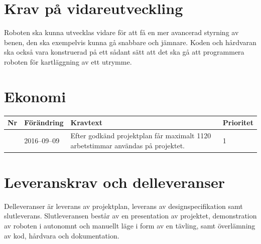 \documentclass[a4paper,titlepage,12pt]{article}
\newcounter{reqNr}
\newcommand{\nextReqNr}{\stepcounter{reqNr}\arabic{reqNr}}
\begin{document}
	\section{Krav på vidareutveckling}
	Roboten ska kunna utvecklas vidare för att få en mer avancerad styrning av benen, 
	den ska exempelvis kunna gå snabbare och jämnare. Koden och hårdvaran ska också vara
	konstruerad på ett sådant sätt att det ska gå att programmera roboten för
	kartläggning av ett utrymme.

	\section{Ekonomi}

	\begin{table}[h]
		\begin{tabularx}{\textwidth}{c l X l}
			\textbf{Nr} & \textbf{Förändring} & \textbf{Kravtext} & \textbf{Prioritet} 
			\\ \midrule
			
			\nextReqNr{} & 2016--09--09 & Efter godkänd projektplan får
            maximalt 1120 arbetstimmar användas på projektet. & 1
		\end{tabularx}
	\end{table}

	\section{Leveranskrav och delleveranser}
	Delleveranser är leverans av projektplan, leverans av designspecifikation 
	samt slutleverans. Slutleveransen består av en presentation av projektet, 
	demonstration av roboten i autonomnt och manuellt läge i form av en tävling,
	samt överlämning av kod, hårdvara och dokumentation.
\end{document}

